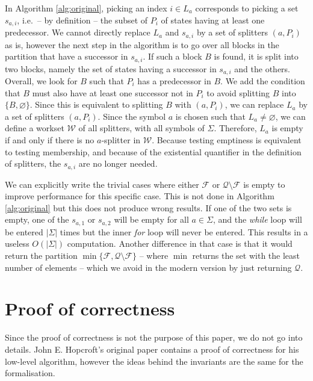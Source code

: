 \documentclass[12pt, a4 paper]{article}
\theoremstyle{definition}
\begin{document}
In Algorithm \ref{alg:original}, picking an index $i \in L_a$ corresponds to picking a set $s_{a, i}$, i.e.\ -- by definition -- the subset of $P_i$ of states having at least one predecessor.
We cannot directly replace $L_a$ and $s_{a, i}$ by a set of splitters $(a, P_i)$ as is, however the next step in the algorithm is to go over all blocks in the partition that have a successor in $s_{a, i}$.
If such a block $B$ is found, it is split into two blocks, namely the set of states having a successor in $s_{a, i}$ and the others.
Overall, we look for $B$ such that $P_i$ has a predecessor in $B$. We add the condition that $B$ must also have at least one successor not in $P_i$ to avoid splitting $B$ into $\{B, \varnothing\}$.
Since this is equivalent to splitting $B$ with $(a, P_i)$, we can replace $L_a$ by a set of splitters $(a, P_i)$.
Since the symbol $a$ is chosen such that $L_a \neq \varnothing$, we can define a workset $\mathcal{W}$ of all splitters, with all symbols of $\Sigma$. Therefore, $L_a$ is empty if and only if there is no $a$-splitter in $\mathcal{W}$.
Because testing emptiness is equivalent to testing membership, and because of the existential quantifier in the definition of splitters, the $s_{a, i}$ are no longer needed.

We can explicitly write the trivial cases where either $\mathcal{F}$ or $\mathcal{Q}\setminus\mathcal{F}$ is empty to improve performance for this specific case.
This is not done in Algorithm \ref{alg:original} but this does not produce wrong results.
If one of the two sets is empty, one of the $s_{a, 1}$ or $s_{a, 2}$ will be empty for all $a \in \Sigma$, and the \textit{while} loop will be entered $|\Sigma|$ times but the inner \textit{for} loop will never be entered.
This results in a useless $O(|\Sigma|)$ computation.
Another difference in that case is that it would return the partition $\min\{\mathcal{F}, \mathcal{Q}\setminus\mathcal{F}\}$ -- where $\min$ returns the set with the least number of elements --  which we avoid in the modern version by just returning $\mathcal{Q}$.

\section{Proof of correctness}
Since the proof of correctness is not the purpose of this paper, we do not go into details. John E. Hopcroft's original paper \cite{Hop71} contains a proof of correctness for his low-level algorithm, however the ideas behind the invariants are the same for the formalisation. 
\end{document}
